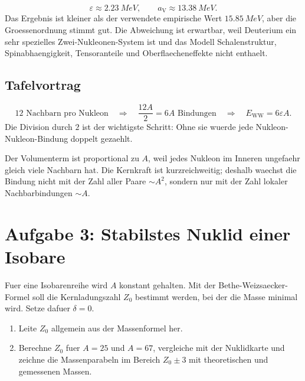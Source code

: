 \documentclass[11pt,a4paper]{scrartcl}
\newcommand{\MeV}{\si{MeV}}
\theoremstyle{definition}
\theoremstyle{plain}
\theoremstyle{remark}
\newcommand{\EWW}{E_{\mathrm{WW}}}
\newcommand{\aV}{a_{\mathrm V}}
\begin{document}
\begin{enumerate}[label=(\alph*)]
    \begin{answerbox}
    \[
        \boxed{\varepsilon\approx\SI{2.23}{\MeV}},\qquad
        \boxed{\aV\approx\SI{13.38}{\MeV}}.
    \]
    Das Ergebnis ist kleiner als der verwendete empirische Wert $\SI{15.85}{\MeV}$, aber die Groessenordnung stimmt gut. Die Abweichung ist erwartbar, weil Deuterium ein sehr spezielles Zwei-Nukleonen-System ist und das Modell Schalenstruktur, Spinabhaengigkeit, Tensoranteile und Oberflaecheneffekte nicht enthaelt.
    \end{answerbox}
\end{enumerate}

\subsection{Tafelvortrag}
\begin{summarybox}[title=Kernaussage fuer die Tafel]
\[
    \text{12 Nachbarn pro Nukleon}\quad\Rightarrow\quad \frac{12A}{2}=6A\text{ Bindungen}\quad\Rightarrow\quad \EWW=6\varepsilon A.
\]
Die Division durch $2$ ist der wichtigste Schritt: Ohne sie wuerde jede Nukleon-Nukleon-Bindung doppelt gezaehlt.
\end{summarybox}

\begin{notebox}[title=Lernintuition]
Der Volumenterm ist proportional zu $A$, weil jedes Nukleon im Inneren ungefaehr gleich viele Nachbarn hat. Die Kernkraft ist kurzreichweitig; deshalb waechst die Bindung nicht mit der Zahl aller Paare $\sim A^2$, sondern nur mit der Zahl lokaler Nachbarbindungen $\sim A$.
\end{notebox}

\newpage

\section{Aufgabe 3: Stabilstes Nuklid einer Isobare}

\begin{taskbox}
Fuer eine Isobarenreihe wird $A$ konstant gehalten. Mit der Bethe-Weizsaecker-Formel soll die Kernladungszahl $Z_0$ bestimmt werden, bei der die Masse minimal wird. Setze dafuer $\delta=0$.
\begin{enumerate}[label=(\alph*)]
    \item Leite $Z_0$ allgemein aus der Massenformel her.
    \item Berechne $Z_0$ fuer $A=25$ und $A=67$, vergleiche mit der Nuklidkarte und zeichne die Massenparabeln im Bereich $Z_0\pm 3$ mit theoretischen und gemessenen Massen.
\end{enumerate}
\end{taskbox}
\end{document}
